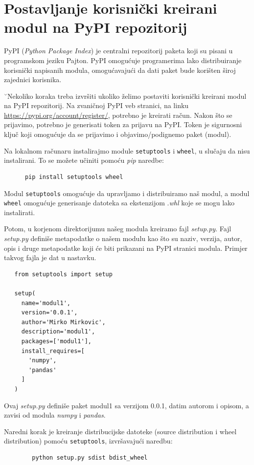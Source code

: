 \section{Postavljanje korisnički kreirani modul  na PyPI repozitorij}

PyPI (\textit{Python Package Index}) je centralni repozitorij paketa   koji su pisani u programskom jeziku Pajton. PyPI omogućuje programerima lako distribuiranje korisnički napisanih modula,  omogućavajući da dati paket bude korišten široj zajednici korisnika.
 
˘Nekoliko   koraka   treba izvršiti ukoliko želimo postaviti   korisnički kreirani modul na PyPI repozitorij. Na zvaničnoj PyPI veb stranici, na linku  \url{https://pypi.org/account/register/},  potrebno je kreirati račun. Nakon što se prijavimo, potrebno je  generisati token za prijavu na PyPI. Token je sigurnosni ključ koji omogućuje da se prijavimo i objavimo/podignemo  paket (modul). 
 
 
 Na lokalnom računaru instalirajmo module  \texttt{setuptools} i \texttt{wheel}, u slučaju da nisu instalirani. To se možete učiniti pomoću \textit{pip} naredbe:
 \begin{verbatim}
      pip install setuptools wheel
 \end{verbatim}

Modul \texttt{setuptools} omogućuje da upravljamo i distribuiramo naš modul, a modul \texttt{wheel}   omogućuje generisanje datoteka sa ekstenzijom .\textit{whl} koje se mogu lako instalirati.

Potom,  u korjenom direktorijumu našeg modula  kreiramo fajl \textit{setup.py}. Fajl \textit{setup.py}  definiše metapodatke o našem modulu kao što su naziv, verzija, autor, opis i druge metapodatke koji će biti prikazani na PyPI stranici   modula. Primjer takvog fajla je dat u nastavku.

\begin{verbatim}
   from setuptools import setup
   
   setup(
     name='modul1',
     version='0.0.1',
     author='Mirko Mirkovic',
     description='modul1',
     packages=['modul1'],
     install_requires=[
       'numpy',
       'pandas'
     ]
   )
\end{verbatim}
Ovaj \textit{ setup.py}   definiše paket modul1 sa verzijom 0.0.1, datim autorom  i opisom, a zavisi od modula \textit{numpy} i \textit{pandas}.

Naredni korak je kreiranje distribucijske datoteke (source distribution i wheel distribution) pomoću \texttt{setuptools}, izvršavajući naredbu:
\begin{verbatim}
        python setup.py sdist bdist_wheel
\end{verbatim}
 
